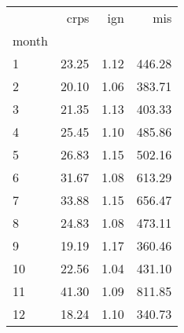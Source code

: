 \begin{tabular}{lrrr}
\toprule
 & crps & ign & mis \\
month &  &  &  \\
\midrule
1 & 23.25 & 1.12 & 446.28 \\
2 & 20.10 & 1.06 & 383.71 \\
3 & 21.35 & 1.13 & 403.33 \\
4 & 25.45 & 1.10 & 485.86 \\
5 & 26.83 & 1.15 & 502.16 \\
6 & 31.67 & 1.08 & 613.29 \\
7 & 33.88 & 1.15 & 656.47 \\
8 & 24.83 & 1.08 & 473.11 \\
9 & 19.19 & 1.17 & 360.46 \\
10 & 22.56 & 1.04 & 431.10 \\
11 & 41.30 & 1.09 & 811.85 \\
12 & 18.24 & 1.10 & 340.73 \\
\bottomrule
\end{tabular}
